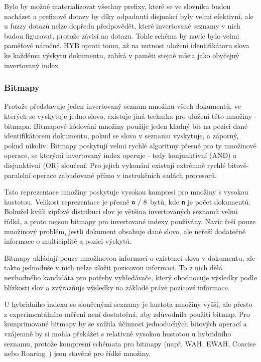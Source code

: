 \documentclass[11pt,letterpaper,oneside,openright]{book}
\newcommand{\bftt}[1]{\texttt{\textbf{#1}}}
\begin{document}
Bylo by možné materializovat všechny prefixy, které se ve slovníku budou
nacházet a prefixové dotazy by díky odpadnutí disjunkcí byly velmi efektivní,
ale u fuzzy dotazů nelze dopředu předpovědět, které invertované seznamy v nich
budou figurovat, protože závisí na dotazu. Tohle schéma by navíc bylo velmi
paměťově náročné. HYB oproti tomu, až na nutnost uložení identifikátoru slova
ke každému výskytu dokumentu, zabírá v paměti stejně místa jako obyčejný
invertovaný index

\subsubsection{Bitmapy}
Protože představuje jeden invertovaný seznam množinu všech dokumentů, ve
kterých se vyskytuje jedno slovo, existuje jiná technika pro uložení této
množiny - bitmapa. Bitmapové kódování množiny použije jeden kladný bit na
pozici dané identifikátorem dokumentu, pokud se slovo v seznamu vyskytuje, a
záporný, pokud nikoliv. Bitmapy poskytují velmi rychlé algoritmy přesně pro ty
množinové operace, se kterými invertovaný index operuje - tedy konjunktivní
(AND) a disjunktivní (OR) sloučení. Pro jejich vykonání existují extrémně
rychlé bitově-paralelní operace zabudované přímo v instrukčních sadách
procesorů.

Tato reprezentace množiny poskytuje vysokou kompresi pro množiny s vysokou
hustotou. Velikost reprezentace je přesně $\bftt{n}\ /\ 8$ bytů, kde \bftt{n}
je počet dokumentů. Bohužel kvůli zipfově distribuci slov je většina
invertovaných seznamů velmi řídká, a proto nejsou bitmapy pro invertované
indexy používány. Navíc řeší pouze množinový problém, jestli dokument obsahuje
dané slovo, ale neřeší dodatečné informace o multiciplitě a pozici výskytů.

Bitmapy ukládají pouze množinovou informaci o existenci slova v dokumentu, ale
takto jednoduše v nich nelze uložit pozicovou informaci. To z nich dělá
nevhodného kandidáta pro potřeby vyhledávače, který ohodnocuje výsledky podle
blízkosti slov a zvýrazňuje výsledky na základě právě pozicové informace.

U hybridního indexu se sloučenými seznamy je hustota množiny vyšší, ale přesto
z experimentálního měření není dostatečná, aby zdůvodnila použití bitmap. Pro
komprimované bitmapy by se snížila účinnost jednoduchých bitových operací a
vzájemně by si mohla překážet s relativně vysokou hustotou u hybridního
seznamu, protože kompresní schémata pro bitmapy (např. WAH, EWAH, Concise nebo
Roaring~\cite{DBLP:journals/corr/LemireKK16}) jsou stavěné pro řídké množiny.
\end{document}
